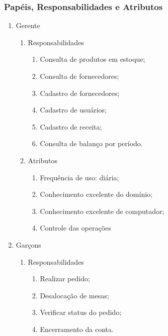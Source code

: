 \subsubsection{Papéis, Responsabilidades e Atributos}

\begin{enumerate}
  \item Gerente

  \begin{enumerate}
    \item Responsabilidades

      \begin{enumerate}
        \item Consulta de produtos em estoque;
        \item Consulta de fornecedores;
        \item Cadastro de fornecedores;
        \item Cadastro de usuários;
        \item Cadastro de receita;
        \item Consulta de balanço por período.
      \end{enumerate}

    \item Atributos

      \begin{enumerate}
        \item Frequência de uso: diária;
        \item Conhecimento excelente do domínio;
        \item Conhecimento excelente de computador;
        \item Controle das operações
      \end{enumerate}
  \end{enumerate}

  \item Garçons

  \begin{enumerate}
    \item Responsabilidades

      \begin{enumerate}
          \item Realizar pedido;
          \item Desalocação de mesas;
          \item Verificar status do pedido;
          \item Encerramento da conta.
      \end{enumerate}


\end{enumerate}
\end{enumerate}

